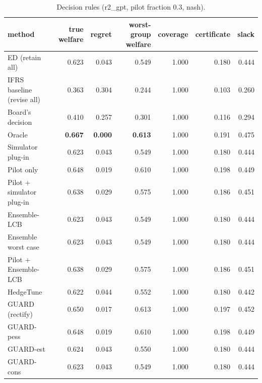 \begin{table}[t]
\centering
\small
\begin{tabular}{lrrrrrr}
\toprule
method & true welfare & regret & worst-group welfare & coverage & certificate & slack \\
\midrule
ED (retain all) & 0.623 & 0.043 & 0.549 & 1.000 & 0.180 & 0.444 \\
IFRS baseline (revise all) & 0.363 & 0.304 & 0.244 & 1.000 & 0.103 & 0.260 \\
Board's decision & 0.410 & 0.257 & 0.301 & 1.000 & 0.116 & 0.294 \\
Oracle & \textbf{0.667} & \textbf{0.000} & \textbf{0.613} & 1.000 & 0.191 & 0.475 \\
Simulator plug-in & 0.623 & 0.043 & 0.549 & 1.000 & 0.180 & 0.444 \\
Pilot only & 0.648 & 0.019 & 0.610 & 1.000 & 0.198 & 0.449 \\
Pilot + simulator plug-in & 0.638 & 0.029 & 0.575 & 1.000 & 0.186 & 0.451 \\
Ensemble-LCB & 0.623 & 0.043 & 0.549 & 1.000 & 0.180 & 0.444 \\
Ensemble worst case & 0.623 & 0.043 & 0.549 & 1.000 & 0.180 & 0.444 \\
Pilot + Ensemble-LCB & 0.638 & 0.029 & 0.575 & 1.000 & 0.186 & 0.451 \\
HedgeTune & 0.622 & 0.044 & 0.552 & 1.000 & 0.180 & 0.442 \\
GUARD (rectify) & 0.650 & 0.017 & 0.613 & 1.000 & 0.197 & 0.452 \\
GUARD-pess & 0.648 & 0.019 & 0.610 & 1.000 & 0.198 & 0.449 \\
GUARD-est & 0.624 & 0.043 & 0.550 & 1.000 & 0.180 & 0.444 \\
GUARD-cons & 0.623 & 0.043 & 0.549 & 1.000 & 0.180 & 0.444 \\
\bottomrule
\end{tabular}
\caption{Decision rules (r2\_gpt, pilot fraction 0.3, nash).}
\label{tab:methods-nash}
\end{table}
